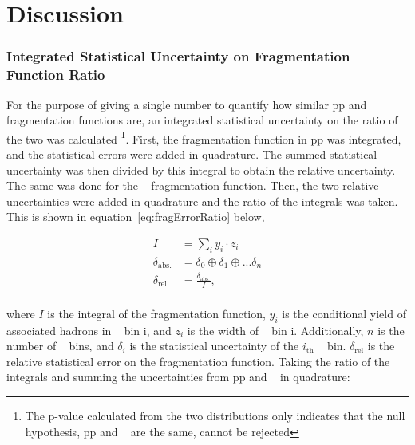 





% 

\chapter{Discussion}

\subsection{Integrated Statistical Uncertainty on Fragmentation Function Ratio}
For the purpose of giving a single number to quantify how similar pp and \pPb~ fragmentation functions are, an integrated statistical uncertainty on the ratio of the two was calculated \footnote{The p-value calculated from the two distributions only indicates that the null hypothesis, pp and \pPb~ are the same, cannot be rejected}. First, the fragmentation function in pp was integrated, and the statistical errors were added in quadrature. The summed statistical uncertainty was then divided by this integral to obtain the relative uncertainty. The same was done for the \pPb~ fragmentation function. Then, the two relative uncertainties were added in quadrature and the ratio of the integrals was taken. This is shown in equation~\ref{eq:fragErrorRatio} below,

\begin{equation}\label{eq:fragErrorRatio}
\begin{split}
    I &= \sum_i y_i\cdot z_i \\
    \delta_\mathrm{abs.} &= \delta_0 \oplus \delta_1 \oplus ...\delta_n\\
    \delta_\mathrm{rel} &= \frac{\delta_\mathrm{abs.}}{I},\\
\end{split}
\end{equation}{}

where $I$ is the integral of the fragmentation function, $y_i$ is the conditional yield of associated hadrons in \zt~ bin i, and $z_i$ is the width of \zt~ bin i. Additionally, $n$ is the number of \zt~ bins, and $\delta_i$ is the statistical uncertainty of the $i_\mathrm{th}$ \zt~ bin. $\delta_\mathrm{rel}$ is the relative statistical error on the fragmentation function. Taking the ratio of the integrals and summing the uncertainties from pp and \pPb~ in quadrature:

